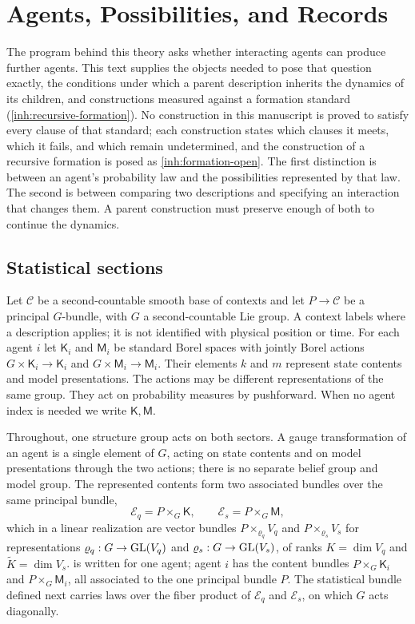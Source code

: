\chapter{Agents, Possibilities, and Records}
\label{ch:foundations}

The program behind this theory asks whether interacting agents can produce further agents. This text supplies the objects needed to pose that question exactly, the conditions under which a parent description inherits the dynamics of its children, and constructions measured against a formation standard (\cref{inh:recursive-formation}). No construction in this manuscript is proved to satisfy every clause of that standard; each construction states which clauses it meets, which it fails, and which remain undetermined, and the construction of a recursive formation is posed as \cref{inh:formation-open}. The first distinction is between an agent's probability law and the possibilities represented by that law. The second is between comparing two descriptions and specifying an interaction that changes them. A parent construction must preserve enough of both to continue the dynamics.

\section{Statistical sections}

Let $\mathcal C$ be a second-countable smooth base of contexts and let $P\to\mathcal C$ be a principal $G$-bundle, with $G$ a second-countable Lie group. A context labels where a description applies; it is not identified with physical position or time. For each agent $i$ let $\mathsf K_i$ and $\mathsf M_i$ be standard Borel spaces with jointly Borel actions $G\times\mathsf K_i\to\mathsf K_i$ and $G\times\mathsf M_i\to\mathsf M_i$. Their elements $k$ and $m$ represent state contents and model presentations. The actions may be different representations of the same group. They act on probability measures by pushforward. When no agent index is needed we write $\mathsf K,\mathsf M$.

Throughout, one structure group acts on both sectors. A gauge transformation of an agent is a single element of $G$, acting on state contents and on model presentations through the two actions; there is no separate belief group and model group. The represented contents form two associated bundles over the same principal bundle,
\begin{equation}
\mathcal E_q=P\times_G\mathsf K,\qquad
\mathcal E_s=P\times_G\mathsf M,
\label{eq:content-bundles}
\end{equation}
which in a linear realization are vector bundles $P\times_{\varrho_q}V_q$ and $P\times_{\varrho_s}V_s$ for representations $\varrho_q:G\to\mathrm{GL}(V_q)$ and $\varrho_s:G\to\mathrm{GL}(V_s)$, of ranks $K=\dim V_q$ and $\tilde K=\dim V_s$.  is written for one agent; agent $i$ has the content bundles $P\times_G\mathsf K_i$ and $P\times_G\mathsf M_i$, all associated to the one principal bundle $P$. The statistical bundle defined next carries laws over the fiber product of $\mathcal E_q$ and $\mathcal E_s$, on which $G$ acts diagonally.

